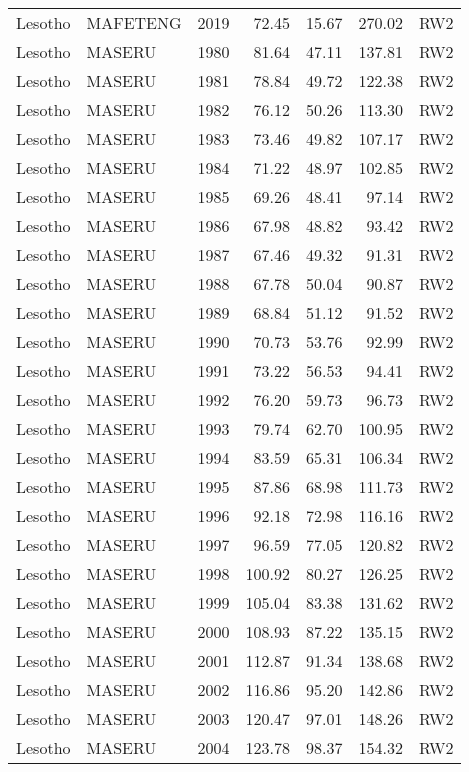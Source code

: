 \begin{longtable}{lllrrrl}
  Lesotho & MAFETENG & 2019 & 72.45 & 15.67 & 270.02 & RW2 \\ 
  Lesotho & MASERU & 1980 & 81.64 & 47.11 & 137.81 & RW2 \\ 
  Lesotho & MASERU & 1981 & 78.84 & 49.72 & 122.38 & RW2 \\ 
  Lesotho & MASERU & 1982 & 76.12 & 50.26 & 113.30 & RW2 \\ 
  Lesotho & MASERU & 1983 & 73.46 & 49.82 & 107.17 & RW2 \\ 
  Lesotho & MASERU & 1984 & 71.22 & 48.97 & 102.85 & RW2 \\ 
  Lesotho & MASERU & 1985 & 69.26 & 48.41 & 97.14 & RW2 \\ 
  Lesotho & MASERU & 1986 & 67.98 & 48.82 & 93.42 & RW2 \\ 
  Lesotho & MASERU & 1987 & 67.46 & 49.32 & 91.31 & RW2 \\ 
  Lesotho & MASERU & 1988 & 67.78 & 50.04 & 90.87 & RW2 \\ 
  Lesotho & MASERU & 1989 & 68.84 & 51.12 & 91.52 & RW2 \\ 
  Lesotho & MASERU & 1990 & 70.73 & 53.76 & 92.99 & RW2 \\ 
  Lesotho & MASERU & 1991 & 73.22 & 56.53 & 94.41 & RW2 \\ 
  Lesotho & MASERU & 1992 & 76.20 & 59.73 & 96.73 & RW2 \\ 
  Lesotho & MASERU & 1993 & 79.74 & 62.70 & 100.95 & RW2 \\ 
  Lesotho & MASERU & 1994 & 83.59 & 65.31 & 106.34 & RW2 \\ 
  Lesotho & MASERU & 1995 & 87.86 & 68.98 & 111.73 & RW2 \\ 
  Lesotho & MASERU & 1996 & 92.18 & 72.98 & 116.16 & RW2 \\ 
  Lesotho & MASERU & 1997 & 96.59 & 77.05 & 120.82 & RW2 \\ 
  Lesotho & MASERU & 1998 & 100.92 & 80.27 & 126.25 & RW2 \\ 
  Lesotho & MASERU & 1999 & 105.04 & 83.38 & 131.62 & RW2 \\ 
  Lesotho & MASERU & 2000 & 108.93 & 87.22 & 135.15 & RW2 \\ 
  Lesotho & MASERU & 2001 & 112.87 & 91.34 & 138.68 & RW2 \\ 
  Lesotho & MASERU & 2002 & 116.86 & 95.20 & 142.86 & RW2 \\ 
  Lesotho & MASERU & 2003 & 120.47 & 97.01 & 148.26 & RW2 \\ 
  Lesotho & MASERU & 2004 & 123.78 & 98.37 & 154.32 & RW2 \\ 

\end{longtable}
